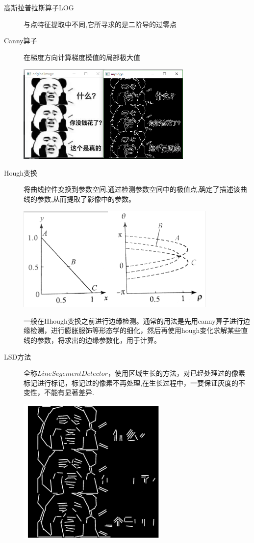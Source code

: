 \documentclass[a4paper,16pt,UTF8]{article}
\begin{document}
\begin{description}
    \item[高斯拉普拉斯算子LOG]
    与点特征提取中不同,它所寻求的是二阶导的过零点
    \item[Canny算子]
    在梯度方向计算梯度模值的局部极大值

    \includegraphics[width = 0.7\textwidth]{canny.jpg}

    \item[Hough变换]
    将曲线控件变换到参数空间,通过检测参数空间中的极值点,确定了描述该曲线的参数,从而提取了影像中的参数。

    \includegraphics[width = 0.8\textwidth]{hough.jpg}

    一般在Hhough变换之前进行边缘检测。通常的用法是先用canny算子进行边缘检测，进行膨胀服饰等形态学的细化，然后再使用hough变化求解某些直线的参数，将求出的边缘参数化，用于计算。

    \item[LSD方法]

    全称$Line Segement Detector$，使用区域生长的方法，对已经处理过的像素标记进行标记，标记过的像素不再处理,在生长过程中，一要保证灰度的不变性，不能有显著差异.

    \includegraphics[width = 0.6\textwidth]{lsd.jpg}

\end{description}
\end{document}
